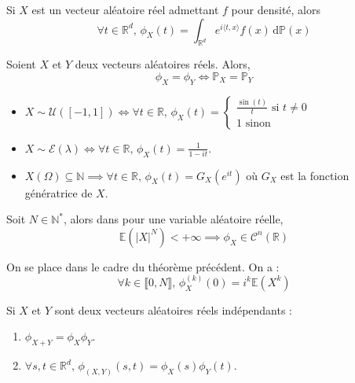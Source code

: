 
	\begin{remark}
		Si $X$ est un vecteur aléatoire réel admettant $f$ pour densité, alors
		\[ \forall t \in \mathbb{R}^d, \, \phi_X(t) = \int_{\mathbb{R}^d} e^{i \langle t, x \rangle} f(x) \, \mathrm{d}\mathbb{P}(x) \]
	\end{remark}


	\begin{theorem}
		Soient $X$ et $Y$ deux vecteurs aléatoires réels. Alors,
		\[ \phi_X = \phi_Y \iff \mathbb{P}_X = \mathbb{P}_Y \]
	\end{theorem}

	\begin{example}
		\begin{itemize}
			\item $X \sim \mathcal{U}([-1, 1]) \iff \forall t \in \mathbb{R}, \, \phi_X(t) = \begin{cases}
				\frac{\sin(t)}{t} \text{ si } t \neq 0 \\
				1 \text{ sinon}
			\end{cases}$
			\item $X \sim \mathcal{E}(\lambda) \iff \forall t \in \mathbb{R}, \, \phi_X(t) = \frac{1}{1-it}$.
			\item $X(\Omega) \subseteq \mathbb{N} \implies \forall t \in \mathbb{R}, \, \phi_X(t) = G_X(e^{it})$ où $G_X$ est la fonction génératrice de $X$.
		\end{itemize}
	\end{example}

	\begin{theorem}
		Soit $N \in \mathbb{N}^*$, alors dans pour une variable aléatoire réelle,
		\[ \mathbb{E}(\vert X \vert^N) < +\infty \implies \phi_X \in \mathcal{C}^n(\mathbb{R}) \]
	\end{theorem}

	\begin{corollary}
		On se place dans le cadre du théorème précédent. On a :
		\[ \forall k \in \llbracket 0, N \rrbracket, \, \phi_X^{(k)} (0) = i^k \mathbb{E}(X^k) \]
	\end{corollary}

	\begin{theorem}
		Si $X$ et $Y$ sont deux vecteurs aléatoires réels indépendants :
		\begin{enumerate}[label=(\roman*)]
			\item $\phi_{X+Y} = \phi_X \phi_Y$.
			\item $\forall s, t \in \mathbb{R}^d, \, \phi_{(X,Y)}(s,t) = \phi_X(s) \phi_Y(t)$.
		\end{enumerate}
	\end{theorem}

